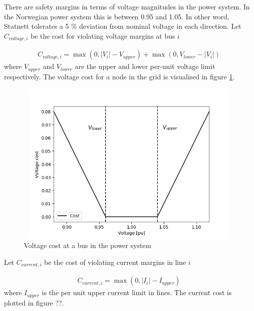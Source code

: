 \documentclass[class=book, crop=false]{standalone}
\begin{document}
There are safety margins in terms of voltage magnitudes in the power system. In the Norwegian power system this is between 0.95 and 1.05. In other word, Statnett tolerates a 5 \% deviation from nominal voltage in each direction. Let $C_{voltage,i}$ be the cost for violating voltage margins at bus $i$


\begin{equation}
   \begin{aligned}
   \label{eq:problem:voltage_margins_cost}
    C_{voltage,i} = \max(0,|V_{i}| - V_{upper}) + \max(0,V_{lower}- |V_{i}|)
    \end{aligned} 
\end{equation}
where $V_{upper}$ and $V_{lower}$ are the upper and lower per-unit voltage limit respectively. The voltage cost for a node in the grid is visualised in figure \ref{fig:problem:voltage_cost}.
\begin{figure}[ht]
    \center
\includegraphics[height=8cm, width=12cm]{figures/voltage_cost.png}
    \caption[size = 9]{Voltage cost at a bus in the power system}
    \label{fig:problem:voltage_cost}
\end{figure}

Let $C_{current,i}$ be the cost of violating current margins in line $i$

\begin{equation}
   \begin{aligned}
   \label{eq:problem:current_margins_cost}
    C_{current,i} = \max(0,|I_{i}| - I_{upper})
    \end{aligned} 
\end{equation}
where $I_{upper}$ is the per unit upper current limit in lines. The current cost is plotted in figure  ??.
\end{document}
